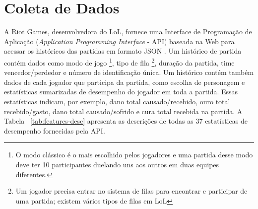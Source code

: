 \section{Coleta de Dados}
A Riot Games, desenvolvedora do LoL, fornece uma Interface de Programação de Aplicação (\textit{Application Programming Interface} - API) baseada na Web para acessar os históricos das partidas em formato JSON \cite{riot1}. Um histórico de partida contém dados como modo de jogo \footnote{O modo clássico é o mais escolhido pelos jogadores e uma partida desse modo deve ter 10 participantes duelando uns aos outros em duas equipes diferentes.}, tipo de fila \footnote{Um jogador precisa entrar no sistema de filas para encontrar e participar de uma partida; existem vários tipos de filas em LoL}, duração da partida, time vencedor/perdedor e número de identificação única. Um histórico contém também dados de cada jogador que participa da partida, como escolha de personagem e estatísticas sumarizadas de desempenho do jogador em toda a partida. Essas estatísticas indicam, por exemplo, dano total causado/recebido, ouro total recebido/gasto, dano total causado/sofrido e cura total recebida na partida. A Tabela ~\ref{tab:features-desc} apresenta as descrições de todas as 37 estatísticas de desempenho fornecidas pela API.

